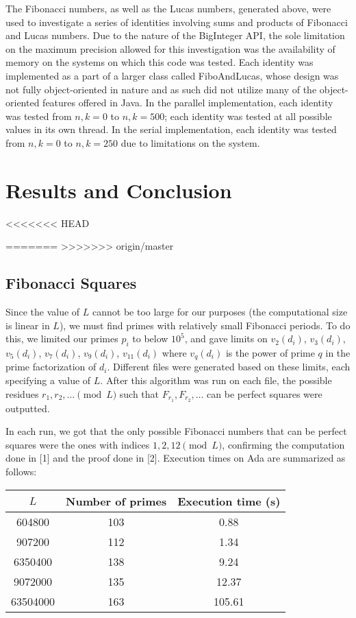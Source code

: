 \documentclass[11pt]{article}
\begin{document}
The Fibonacci numbers, as well as the Lucas numbers, generated above, were used to investigate a series of identities involving sums and products of Fibonacci and Lucas numbers. Due to the nature of the BigInteger API, the sole limitation on the maximum precision allowed for this investigation was the availability of memory on the systems on which this code was tested. Each identity was implemented as a part of a larger class called FiboAndLucas, whose design was not fully object-oriented in nature and as such did not utilize many of the object-oriented features offered in Java. In the parallel implementation, each identity was tested from $n, k = 0$ to $n, k = 500$; each identity was tested at all possible values in its own thread. In the serial implementation, each identity was tested from $n,k = 0$ to $n,k = 250$ due to limitations on the system.
\section{Results and Conclusion}
<<<<<<< HEAD

=======
>>>>>>> origin/master
\subsection{Fibonacci Squares}
Since the value of $L$ cannot be too large for our purposes (the computational size is linear in $L$), we must find primes with relatively small Fibonacci periods. To do this, we limited our primes $p_i$ to below $10^5$, and gave limits on $v_2(d_i)$, $v_3(d_i)$, $v_5(d_i)$, $v_7(d_i)$, $v_9(d_i)$, $v_{11}(d_i)$ where $v_q(d_i)$ is the power of prime $q$ in the prime factorization of $d_i$. Different files were generated based on these limits, each specifying a value of $L$. After this algorithm was run on each file, the possible residues $r_1, r_2, \dots \pmod L$ such that $F_{r_1}, F_{r_2}, \dots$ can be perfect squares were outputted.

In each run, we got that the only possible Fibonacci numbers that can be perfect squares were the ones with indices $1, 2, 12 \pmod{L}$, confirming the computation done in [1] and the proof done in [2]. Execution times on Ada are summarized as follows:

\begin{tabular}{ccc}
\hline
$L$ & Number of primes & Execution time (s) \\ \hline
604800 & 103 & 0.88 \\
907200 & 112 & 1.34 \\
6350400 & 138 & 9.24 \\
9072000 & 135 & 12.37 \\
63504000 & 163 & 105.61 \\ \hline \hline
\end{tabular}
\end{document}
